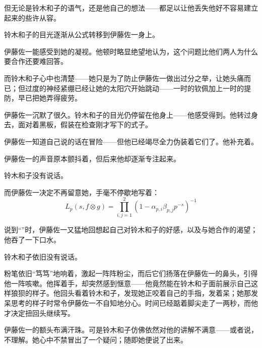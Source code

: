 但无论是铃木和子的语气，还是他自己的想法——都足以让他丢失他好不容易建立起来的些许从容。

铃木和子的目光逐渐从公式转移到伊藤佐一身上。

伊藤佐一能感受到她的凝视。他顿时略显绝望地认为，这个问题比他们两人为什么要合作还要难回答。

而铃木和子心中也清楚——她只是为了防止伊藤佐一做出过分之举，让她头痛而已；但过度的神经紧绷已经让她的太阳穴开始跳动——一时的钦佩加上一时的提防，早已把她弄得疲劳。

伊藤佐一沉默了很久。铃木和子的目光仍停留在他身上——他感受得到。他转过身去，面对着黑板，假装在检查刚才写下的式子。

伊藤佐一知道自己说的话在冒险——但他已经竭尽全力伪装着它们了。他补充着。


伊藤佐一的声音原本颤抖着，但后来他却逐渐专注起来。

铃木和子没有说话。

而伊藤佐一决定不再留意她，手毫不停歇地写着：
\[
  L_p(s,f\otimes g)
  =
  \prod_{i,j=1}^{2}
  \!\left(1-\alpha_{p,i}\beta_{p,j}p^{-s}\right)^{-1}
\]
 
 
说到“”时，伊藤佐一又猛地回想起自己对铃木和子的好感，以及与她合作的渴望；他吞了一下口水。

铃木和子依旧没有说话。

粉笔依旧“笃笃”地响着，激起一阵阵粉尘，而后它们扬落在伊藤佐一的鼻头，引得他一阵咳嗽。他挥着手，却突然感到惬意——他竟然能在铃木和子面前展示自己这样狼狈的样子。他回头看着铃木和子，发现她正咬着自己的手指，发着呆；她那发呆思考的样子时常令伊藤佐一不自知地分心。时间已经踮着脚尖走了一两秒，而他才决定扭回头继续写。


 
伊藤佐一的额头布满汗珠。可是铃木和子仿佛依然对他的讲解不满意——或者说，不理解。她心中不禁冒出了一个疑问；随即她便说了出来。

